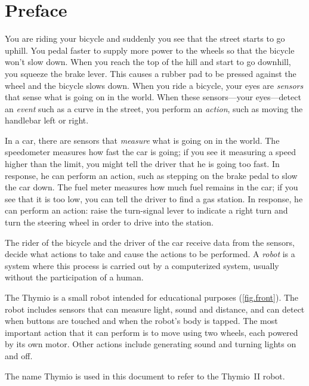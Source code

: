 
\chapter*{Preface}


You are riding your bicycle and suddenly you see that the street starts
to go uphill. You pedal faster to supply more power to the wheels so
that the bicycle won't slow down. When you reach the top of the hill and
start to go downhill, you squeeze the brake lever. This causes a rubber
pad to be pressed against the wheel and the bicycle slows down. When you
ride a bicycle, your eyes are \textit{sensors} that sense what is going
on in the world. When these sensors---your eyes---detect an
\textit{event} such as a curve in the street, you perform an
\textit{action}, such as moving the handlebar left or right.

In a car, there are sensors that \textit{measure} what is going on in
the world. The speedometer measures how fast the car is going; if you
see it measuring a speed higher than the limit, you might tell the
driver that he is going too fast. In response, he can perform an action,
such as stepping on the brake pedal to slow the car down. The fuel meter
measures how much fuel remains in the car; if you see that it is too
low, you can tell the driver to find a gas station. In response, he can
perform an action: raise the turn-signal lever to indicate a right turn
and turn the steering wheel in order to drive into the station.

The rider of the bicycle and the driver of the car receive data from the
sensors, decide what actions to take and cause the actions to be
performed. A \textit{robot} is a system where this process is carried out by a
computerized system, usually without the participation of a human.


The Thymio is a small robot intended for educational purposes
(\cref{fig.front}). The robot includes sensors that can measure light,
sound and distance, and can detect when buttons are touched and when the
robot's body is tapped. The most important action that it can perform is
to move using two wheels, each powered by its own motor. Other actions
include generating sound and turning lights on and off.

The name Thymio is used in this document to refer to the Thymio~II
robot.

